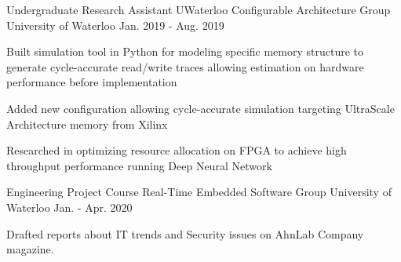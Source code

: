 


\begin{cventries}


\cventry
{Undergraduate Research Assistant} %
{UWaterloo Configurable Architecture Group} %
{University of Waterloo} %
{Jan. 2019 - Aug. 2019} %
{ %
\begin{cvitems}
\item {
Built simulation tool in Python for modeling specific memory 
structure to generate cycle-accurate
read/write traces allowing estimation on 
hardware performance before implementation
}
\item {
Added new configuration allowing 
cycle-accurate simulation targeting UltraScale Architecture
memory from Xilinx
}
\item {
Researched in optimizing resource allocation on FPGA 
to achieve high throughput performance
running Deep Neural Network
}
\end{cvitems}
}


\cventry
{Engineering Project Course} %
{Real-Time Embedded Software Group} %
{University of Waterloo} %
{Jan. - Apr. 2020} %
{ %
\begin{cvitems}
\item {Drafted reports about IT trends and Security issues on AhnLab Company magazine.}
\end{cvitems}
}


\end{cventries}